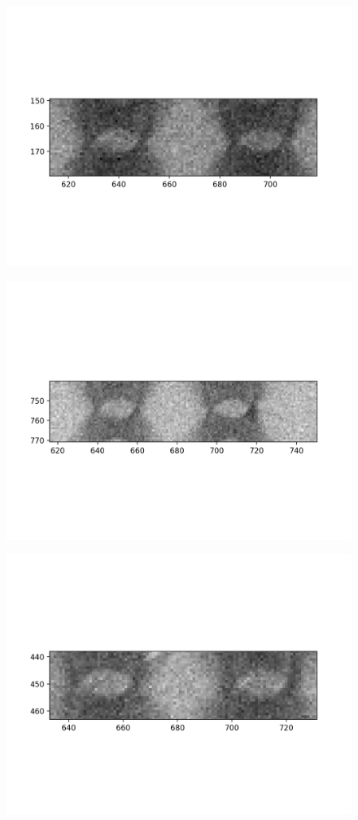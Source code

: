 \documentclass[10pt,a4paper]{article}
\begin{document}
	\begin{figure}[h]
		\includegraphics{data/image_stamps/f3}
	\end{figure}
	\begin{figure}[h]
		\includegraphics{data/image_stamps/f4}
	\end{figure}
	\begin{figure}[h]
		\includegraphics{data/image_stamps/f5}
	\end{figure}
\end{document}
